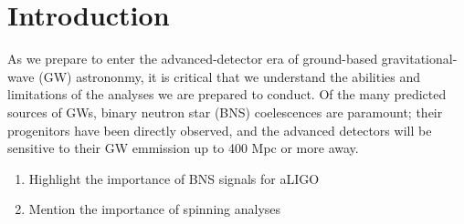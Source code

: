 \section{Introduction}

As we prepare to enter the advanced-detector era of ground-based gravitational-wave (GW) astrononmy, it is critical that we understand the abilities and limitations of the analyses we are prepared to conduct.  Of the many predicted sources of GWs, binary neutron star (BNS) coelescences are paramount; their progenitors have been directly observed, and the advanced detectors will be sensitive to their GW emmission up to 400 Mpc or more away\cite{2013arXiv1304.0670L}.

\begin{enumerate}
\item Highlight the importance of BNS signals for aLIGO
\item Mention the importance of spinning analyses
\end{enumerate}